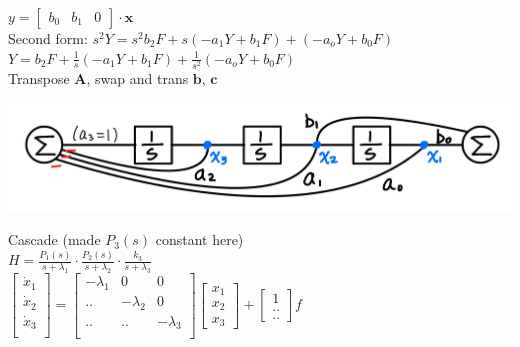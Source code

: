 \documentclass[4pt]{article}
\theoremstyle{definition}
\theoremstyle{definition}
\begin{document}
\begin{landscape}
\begin{multicols}{3}
    \(y =
    \begin{bmatrix}
        b_0 & b_1 & 0      %
    \end{bmatrix}
    \cdot \mathbf x
    \)\\

    Second form: \(s^2 Y = s^2 b_2 F + s(-a_1 Y + b_1 F) + (-a_o Y + b_0 F)\)\\
    \(Y = b_2 F + \frac 1 s(-a_1 Y + b_1 F) + \frac 1 {s^2}(-a_o Y + b_0 F)\)\\
    Transpose $\mathbf A$, swap and trans $\mathbf b$, $\mathbf c$

    \includegraphics[width=\linewidth]{figures/canonical.jpg}

    Cascade (made $P_3(s)$ constant here)\\
    \(H = \frac {P_1(s)}{s+\lambda_1} \cdot \frac{P_2(s)}{s+\lambda_2} \cdot \frac{k_3}{s+\lambda_3}\)\\
    \(
    \begin{bmatrix}
        \dot{x}_1\\
        \dot{x}_2\\
        \dot{x}_3\\
    \end{bmatrix}
    =
    \begin{bmatrix}
        -\lambda_1 & 0 & 0\\
        .. & -\lambda_2 & 0\\
        .. & .. & -\lambda_3\\     %
    \end{bmatrix}
    \begin{bmatrix}
        x_1\\
        x_2\\
        x_3
    \end{bmatrix}
    +
    \begin{bmatrix}
        1\\..\\..         %
    \end{bmatrix}
    f
    \)\\


\end{multicols}
\end{landscape}
\end{document}
